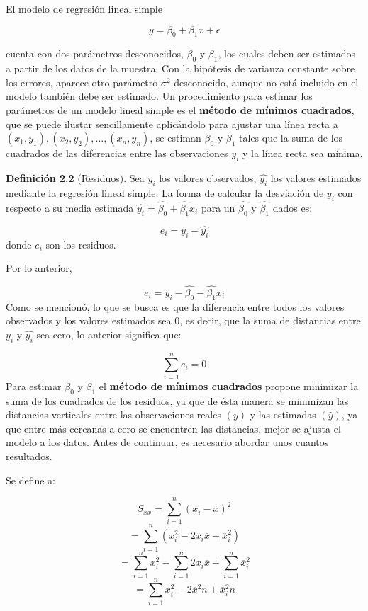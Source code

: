\documentclass[
  a4paper,
  oneside,
  openany]{book}
\begin{document}
El modelo de regresión lineal simple

\[y=\beta_{0}+\beta_{1}x+\epsilon\]

cuenta con dos parámetros desconocidos, \(\beta_{0}\) y \(\beta_{1}\), los cuales deben ser estimados a partir de los datos de la muestra. Con la hipótesis de varianza constante sobre los errores, aparece otro parámetro \(\sigma^2\) desconocido, aunque no está incluido en el modelo también debe ser estimado.
Un procedimiento para estimar los parámetros de un modelo lineal simple es el \textbf{método de mínimos cuadrados}, que se puede ilustar sencillamente aplicándolo para ajustar una línea recta a \((x_{1},y_{1}),(x_{2},y_{2}),\ldots,(x_{n},y_{n})\), se estiman \(\beta_{0}\) y \(\beta_{1}\) tales que la suma de los cuadrados de las diferencias entre las observaciones \(y_{i}\) y la línea recta sea mínima.

\textbf{Definición 2.2} (Residuos). Sea \(y_{i}\) los valores observados, \(\hat{y_{i}}\) los valores estimados mediante la regresión lineal simple. La forma de calcular la desviación de \(y_{i}\) con respecto a su media estimada \(\hat{y_{i}}=\hat{\beta_{0}}+\hat{\beta_{1}}x_{i}\) para un \(\hat{\beta_{0}}\) y \(\hat{\beta_{1}}\) dados es:

\[e_{i}=y_{i}-\hat{y_{i}}\]
donde \(e_{i}\) son los residuos.

Por lo anterior,

\[e_{i}=y_{i}-\hat{\beta_{0}}-\hat{\beta_{1}}x_{i}\]
Como se mencionó, lo que se busca es que la diferencia entre todos los valores observados y los valores estimados sea 0, es decir, que la suma de distancias entre \(y_{i}\) y \(\hat{y_{i}}\) sea cero, lo anterior significa que:

\[\sum_{i=1}^{n}e_{i}=0\]
Para estimar \(\beta_{0}\) y \(\beta_{1}\) el \textbf{método de mínimos cuadrados} propone minimizar la suma de los cuadrados de los residuos, ya que de ésta manera se minimizan las distancias verticales entre las observaciones reales \((y)\) y las estimadas \((\hat{y})\), ya que entre más cercanas a cero se encuentren las distancias, mejor se ajusta el modelo a los datos.
Antes de continuar, es necesario abordar unos cuantos resultados.

Se define a:

\[S_{xx}=\sum_{i=1}^{n}(x_{i}-\overline{x})^{2}\]
\[=\sum_{i=1}^{n}(x_{i}^2-2x_{i}\overline{x}+\overline{x}_{i}^{2})\]
\[=\sum_{i=1}^{n}x_{i}^{2}-\sum_{i=1}^{n}2x_{i}\overline{x}+\sum_{i=1}^{n}\overline{x}_{i}^2\]
\[=\sum_{i=1}^{n}x_{i}^2-2\overline{x}^2n+\overline{x}_{i}^2n\]
\end{document}

